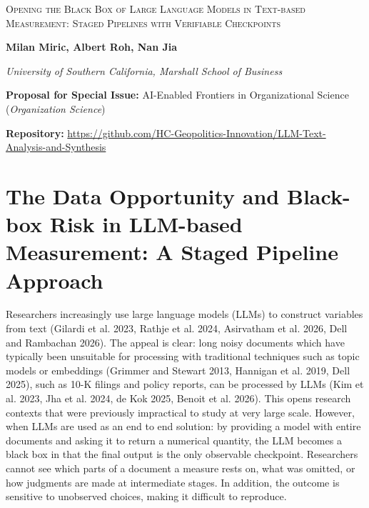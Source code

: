 \documentclass[11pt]{article}
\begin{document}
\begin{center}
    {\LARGE \textsc{Opening the Black Box of Large Language Models in Text-based Measurement: Staged Pipelines with Verifiable Checkpoints}\par}
    \vspace{1.2em}
    {\normalsize\bfseries Milan Miric, Albert Roh, Nan Jia\par}
    \vspace{0.2em}
    {\small\itshape University of Southern California, Marshall School of Business\par}
    \vspace{0.8em}
    {\footnotesize\textbf{Proposal for Special Issue:} AI-Enabled Frontiers in Organizational Science (\textit{Organization Science})\par}
    \vspace{0.3em}
    {\footnotesize\textbf{Repository:} \url{https://github.com/HC-Geopolitics-Innovation/LLM-Text-Analysis-and-Synthesis}\par}
\end{center}

\vspace{1.5em}

\section{The Data Opportunity and Black-box Risk in LLM-based Measurement: A Staged Pipeline Approach}

Researchers increasingly use large language models (LLMs) to construct variables from text (Gilardi et al. 2023, Rathje et al. 2024, Asirvatham et al. 2026, Dell and Rambachan 2026). The appeal is clear: long noisy documents which have typically been unsuitable for processing with traditional techniques such as topic models or embeddings (Grimmer and Stewart 2013, Hannigan et al. 2019, Dell 2025), such as 10-K filings and policy reports, can be processed by LLMs (Kim et al. 2023, Jha et al. 2024, de Kok 2025, Benoit et al. 2026). This opens research contexts that were previously impractical to study at very large scale. However, when LLMs are used as an end to end solution: by providing a model with entire documents and asking it to return a numerical quantity, the LLM becomes a black box in that the final output is the only observable checkpoint. Researchers cannot see which parts of a document a measure rests on, what was omitted, or how judgments are made at intermediate stages. In addition, the outcome is sensitive to unobserved choices, making it difficult to reproduce.
\end{document}
